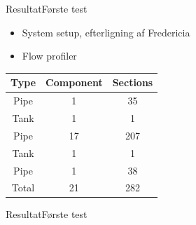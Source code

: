 \begin{frame}{Resultat}{Første test}
	\vfill \vfill\centering
	\begin{minipage}[t]{0.48\linewidth}
	\begin{itemize}
		   	\item System setup, efterligning af Fredericia
		   	\item Flow profiler 
	\end{itemize}    
	\end{minipage}\hfill
	\begin{minipage}[t]{0.48\linewidth}
	\begin{table}[H]
	\centering
	\begin{tabular}{|c|c|c|}
	\hline
		\rowcolor[HTML]{9B9B9B} 
	Type  & Component & Sections \\ \hline
	Pipe  & 1         & 35       \\ \hline
	Tank  & 1         & 1        \\ \hline
	Pipe  & 17        & 207      \\ \hline
	Tank  & 1         & 1        \\ \hline
	Pipe  & 1         & 38        \\ \hline
	Total & 21        & 282      \\ \hline
	\end{tabular}
	\label{tab:system_setup_nonlinear_linear_testv2}
	\end{table}
	\end{minipage}

	\vfill \vfill

\end{frame}

\begin{frame}{Resultat}{Første test}
	\vfill \vfill \centering
	 \begin{figure}[H]
	\centering
	
	\label{fig:Simulering_output_first}
	\end{figure}     
	\begin{figure}[H]
	\centering
	
	\label{fig:Simulering_output_first_concentration}
	\end{figure} 
	\vfill \vfill
\end{frame}




